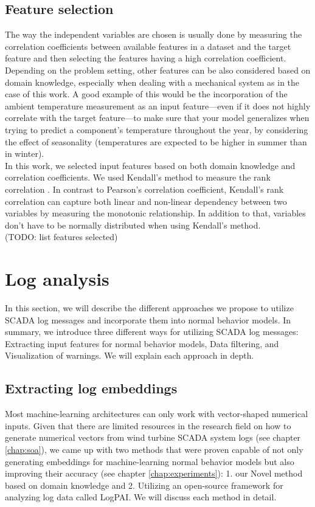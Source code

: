   \subsection{Feature selection}
    The way the independent variables are chosen is usually done by measuring the correlation coefficients between available features in a
    dataset and the target feature and then selecting the features having a high correlation coefficient. Depending on the problem setting, other features can be also considered 
    based on domain knowledge, especially when dealing with a mechanical system as in the case of this work. A good example of this would be the incorporation of 
    the ambient temperature measurement as an input feature---even if it does not highly correlate with the target feature---to make sure that your model generalizes when 
    trying to predict a component's temperature throughout the year, by considering the effect of seasonality 
    (temperatures are expected to be higher in summer than in winter).\\
    In this work, we selected input features based on both domain knowledge and correlation coefficients. We used Kendall's method to measure the rank correlation \cite{Kendall}.
    In contrast to Pearson's correlation coefficient, Kendall's rank correlation can capture both linear and non-linear dependency between two variables by 
    measuring the monotonic relationship. In addition to that, variables don't have to be normally distributed when using Kendall's method.\\
    (TODO: list features selected)

\clearpage
  
\section{Log analysis}
In this section, we will describe the different approaches we propose to utilize SCADA log messages and incorporate them into normal behavior models.
In summary, we introduce three different ways for utilizing SCADA log messages: Extracting input features for normal behavior models, Data filtering, and Visualization of warnings.
We will explain each approach in depth.

\subsection{Extracting log embeddings}
  Most machine-learning architectures can only work with vector-shaped numerical inputs. Given that there are limited resources in the research field on how to generate 
  numerical vectors from wind turbine SCADA system logs (see chapter \ref{chap:soa}), we came up with two methods that were proven capable of not only generating embeddings for 
  machine-learning normal behavior models but also improving their accuracy (see chapter \ref{chap:experiments}): 1. our Novel method based on domain knowledge and 
  2. Utilizing an open-source framework for analyzing log data called LogPAI. We will discuss each method in detail.

